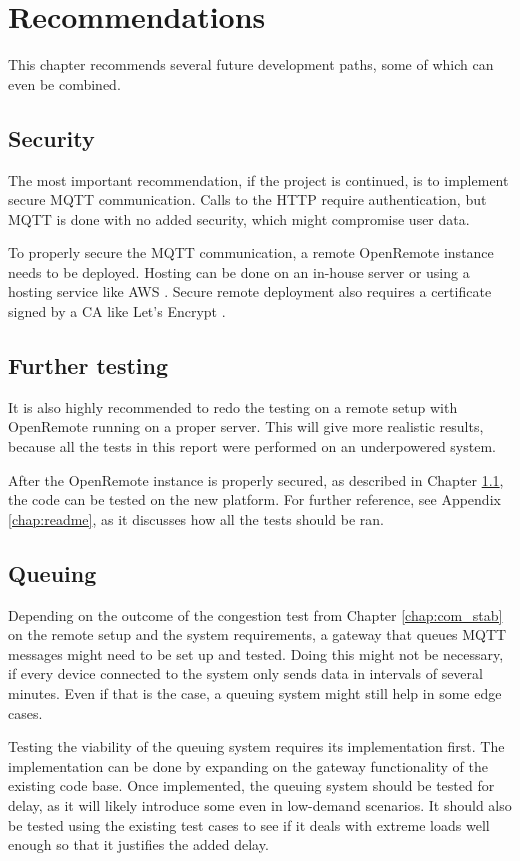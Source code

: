 \chapter{Recommendations}
This chapter recommends several future development paths, some of which can even be combined.  

\section{Security}\label{chap:security}
The most important recommendation, if the project is continued, is to implement secure MQTT communication. Calls to the HTTP require authentication, but MQTT is done with no added security, which might compromise user data.

To properly secure the MQTT communication, a remote OpenRemote instance needs to be deployed. Hosting can be done on an in-house server or using a hosting service like AWS \cite{aws}. Secure remote deployment also requires a certificate signed by a CA like Let's Encrypt \cite{letsencrypt}.

\section{Further testing}
It is also highly recommended to redo the testing on a remote setup with OpenRemote running on a proper server. This will give more realistic results, because all the tests in this report were performed on an underpowered system.

After the OpenRemote instance is properly secured, as described in Chapter \ref{chap:security}, the code can be tested on the new platform. For further reference, see Appendix \ref{chap:readme}, as it discusses how all the tests should be ran. 

\section{Queuing}
Depending on the outcome of the congestion test from Chapter \ref{chap:com_stab} on the remote setup and the system requirements, a gateway that queues MQTT messages might need to be set up and tested. Doing this might not be necessary, if every device connected to the system only sends data in intervals of several minutes. Even if that is the case, a queuing system might still help in some edge cases.

Testing the viability of the queuing system requires its implementation first. The implementation can be done by expanding on the gateway functionality of the existing code base. Once implemented, the queuing system should be tested for delay, as it will likely introduce some even in low-demand scenarios. It should also be tested using the existing test cases to see if it deals with extreme loads well enough so that it justifies the added delay.  

